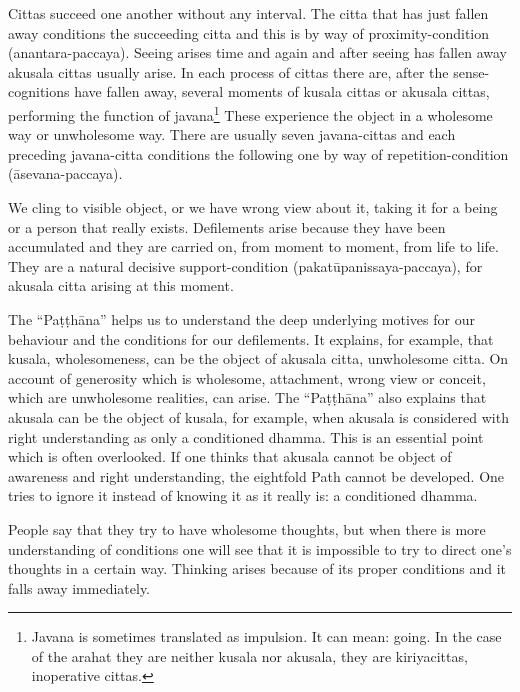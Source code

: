 \documentclass{book}
\begin{document}
Cittas succeed one
another without any interval. The citta that has just fallen away
conditions the succeeding citta and this is by way of
proximity-condition
(anantara-paccaya). Seeing
arises time and again and after seeing has fallen away akusala cittas
usually arise. In each process of cittas there are, after the
sense-cognitions have fallen away, several moments of kusala cittas or
akusala cittas, performing the function of javana\footnote{Javana is sometimes translated as impulsion. It can mean:
going. In the case of the arahat they are neither kusala nor akusala,
they are kiriyacittas, inoperative cittas. }
These experience the object in a wholesome way or unwholesome way. There
are usually seven javana-cittas and each preceding javana-citta
conditions the following one by way of repetition-condition
(āsevana-paccaya).

We cling to visible
object, or we have wrong view about it, taking it for a being or a
person that really exists. Defilements arise because they have been
accumulated and they are carried on, from moment to moment, from life to
life. They are a natural decisive support-condition
(pakatūpanissaya-paccaya),
for akusala citta arising at this moment. 

The
``Paṭṭhāna'' helps us to
understand the deep underlying motives for our behaviour and the
conditions for our defilements. It explains, for example, that kusala,
wholesomeness, can be the object of akusala citta, unwholesome citta. On
account of generosity which is wholesome, attachment, wrong view or
conceit, which are unwholesome realities, can arise. The
``Paṭṭhāna''
also explains that akusala can be the
object of kusala, for example, when akusala is considered with
right understanding as only a conditioned dhamma.
This is an essential point which is
often overlooked. If one thinks that akusala cannot be object of
awareness and right understanding, the eightfold Path cannot be
developed. One tries to ignore it instead of knowing it as
it really is: a conditioned dhamma. 

People say that they try to have wholesome
thoughts, but when there is more understanding of conditions one will
see that it is impossible to try to direct one's thoughts in a certain
way. Thinking arises because of its proper conditions and it falls away
immediately.
\end{document}
